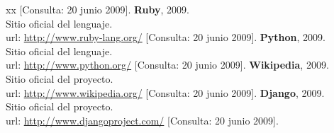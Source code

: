 \begin{thebibliography}{xx}
         [Consulta: 20 junio 2009].
 \textbf{Ruby}, 2009.\\
         Sitio oficial del lenguaje.\\
         url: \url{http://www.ruby-lang.org/}
         [Consulta: 20 junio 2009].
 \textbf{Python}, 2009.\\
         Sitio oficial del lenguaje.\\
         url: \url{http://www.python.org/}
         [Consulta: 20 junio 2009].
 \textbf{Wikipedia}, 2009.\\
         Sitio oficial del proyecto.\\
         url: \url{http://www.wikipedia.org/}
         [Consulta: 20 junio 2009].
 \textbf{Django}, 2009.\\
         Sitio oficial del proyecto.\\
         url: \url{http://www.djangoproject.com/}
         [Consulta: 20 junio 2009].
 \end{thebibliography}